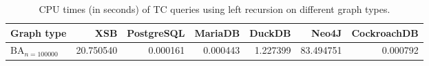 \begin{table}
\caption{CPU times (in seconds) of TC queries using left recursion on different graph types.}
\label{table:left_recursion_cpu_time}
\begin{tabular}{lrrrrrr}
\toprule
Graph type & XSB & PostgreSQL & MariaDB & DuckDB & Neo4J & CockroachDB \\
\midrule
$\text{BA}_{n=100000}$ & 20.750540 & 0.000161 & 0.000443 & 1.227399 & 83.494751 & 0.000792 \\
\bottomrule
\end{tabular}
\end{table}
